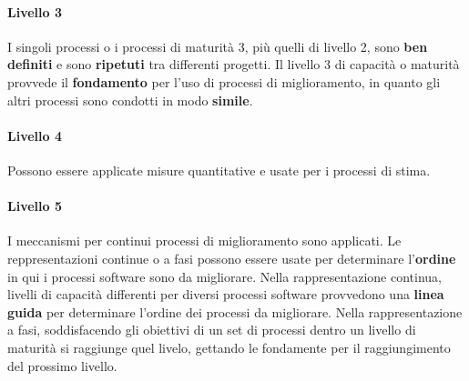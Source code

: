 \paragraph{Livello 3}
I singoli processi o i processi di maturit\`a 3, pi\`u quelli di livello 2, sono \textbf{ben definiti} e sono \textbf{ripetuti} tra differenti progetti. \newline
Il livello 3 di capacit\`a o maturit\`a provvede il \textbf{fondamento} per l'uso di processi di miglioramento, in quanto gli altri processi sono condotti in modo \textbf{simile}. \newline
\paragraph{Livello 4}
Possono essere applicate misure quantitative e usate per i processi di stima.
\paragraph{Livello 5}
I meccanismi per continui processi di miglioramento sono applicati.
\newline \newline
Le reppresentazioni continue o a fasi possono essere usate per determinare l'\textbf{ordine} in qui i processi software sono da migliorare. \newline
Nella rappresentazione continua, livelli di capacit\`a differenti per diversi processi software provvedono una \textbf{linea guida} per determinare l'ordine dei processi da migliorare. \newline 
Nella rappresentazione a fasi, soddisfacendo gli obiettivi di un set di processi dentro un livello di maturit\`a si raggiunge quel livelo, gettando le fondamente per il raggiungimento del prossimo livello.  

